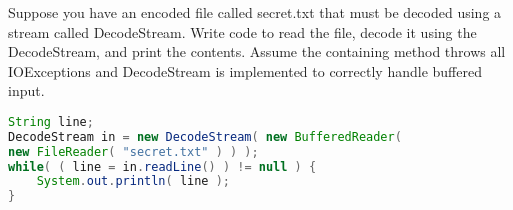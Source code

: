Suppose you have an encoded file called secret.txt that must be decoded using a stream called DecodeStream.  
Write code to read the file, decode it using the DecodeStream, and print the contents.  
Assume the containing method throws all IOExceptions and DecodeStream is implemented to correctly handle buffered input.

\begin{answer}
\begin{lstlisting}[language=java]
String line;
DecodeStream in = new DecodeStream( new BufferedReader( 
new FileReader( "secret.txt" ) ) );
while( ( line = in.readLine() ) != null ) {
	System.out.println( line );
}
\end{lstlisting}
\end{answer}

\vspace{24pt}
